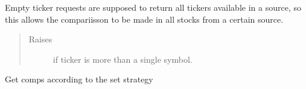 \documentclass[letterpaper,10pt,english]{sphinxmanual}
\begin{document}
\begin{fulllineitems}
\begin{fulllineitems}
Empty ticker requests are supposed to return all tickers available in
a source, so this allows the compariisson to be made in all stocks
from a certain source.
\begin{quote}\begin{description}
\item[{Raises}] \leavevmode
{} \textendash{} if ticker is more than a single symbol.

\end{description}\end{quote}

\end{fulllineitems}


\begin{fulllineitems}
\label{\detokenize{dalio.pipe:dalio.pipe.builders.StockComps.transform}}
Get comps according to the set strategy

\end{fulllineitems}


\end{fulllineitems}

\end{document}
